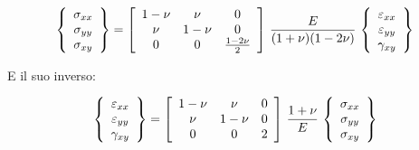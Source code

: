 \begin{equation*}
\left\{
\begin{array}{c}
\sigma_{xx} \\
\sigma_{yy} \\
\sigma_{xy}
\end{array}
\right\}
=
\left[
\begin{array}{ccc}
\displaystyle 1-\nu & \displaystyle \nu & 0\\
\displaystyle \nu & 1-\nu & \large{0} \\
0& 0 & \frac{1-2\nu}{2}
\end{array}
\right]\,
\frac{E}{(1+\nu)(1-2\nu)}\,
\left\{
\begin{array}{c}
\varepsilon_{xx} \\
\varepsilon_{yy} \\
\gamma_{xy}
\end{array}
\right\}
\end{equation*}

E il suo inverso:

\begin{equation*}
\left\{
\begin{array}{c}
\varepsilon_{xx} \\
\varepsilon_{yy} \\
\gamma_{xy}
\end{array}
\right\}
=
\left[
\begin{array}{ccc}
\displaystyle 1-\nu & \displaystyle \nu & 0\\
\displaystyle \nu & 1-\nu & \large{0} \\
0& 0 & 2
\end{array}
\right]\,
\frac{1+\nu}{E}\,
\left\{
\begin{array}{c}
\sigma_{xx} \\
\sigma_{yy} \\
\sigma_{xy}
\end{array}
\right\}
\end{equation*}